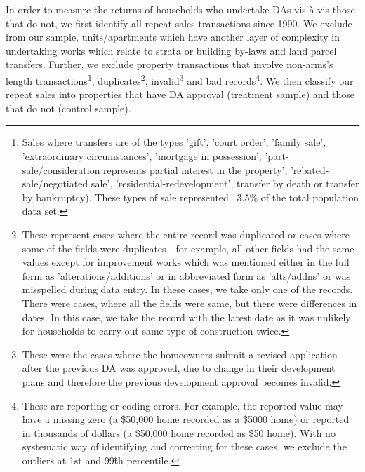 \documentclass[AEJ,reqno, draftmode]{AEA} %
\begin{document}
In order to measure the returns of households who undertake DAs vis-à-vis those that do not, we first identify all repeat sales transactions since 1990. We exclude from our sample, units/apartments which have another layer of complexity in undertaking works which relate to strata or building by-laws and land parcel transfers. Further, we exclude property transactions that involve non-arms's length transactions\footnote{Sales where transfers are of the types 'gift', 'court order', 'family sale', 'extraordinary circumstances', 'mortgage in possession', 'part-sale/consideration represents partial interest in the property', 'rebated-sale/negotiated sale', 'residential-redevelopment', transfer by death or transfer by bankruptcy). These types of sale represented ~3.5\% of the total population data set.}, duplicates\footnote{These represent cases where the entire record was duplicated or cases where some of the fields were duplicates - for example, all other fields had the same values except for improvement works which was mentioned either in the full form as 'alterations/additions' or in abbreviated form  as 'alts/addns' or was misspelled during data entry. In these cases, we take only one of the records. There were cases, where all the fields were same, but there were differences in dates. In this case, we take the record with the latest date as it was unlikely for households to carry out same type of construction twice.}, invalid\footnote{These were the cases where the homeowners submit a revised application after the previous DA was approved, due to change in their development plans and therefore the previous development approval becomes invalid.} and bad records\footnote{These are reporting or coding errors. For example, the reported value may have a missing zero (a \$50,000 home recorded as a \$5000 home) or reported in thousands of dollars (a \$50,000 home recorded as \$50 home). With no systematic way of identifying and correcting for these cases, we exclude the outliers at 1st and 99\^{th} percentile.}. We then classify our repeat sales into properties that have DA approval (treatment sample) and those that do not (control sample). 
\end{document}
